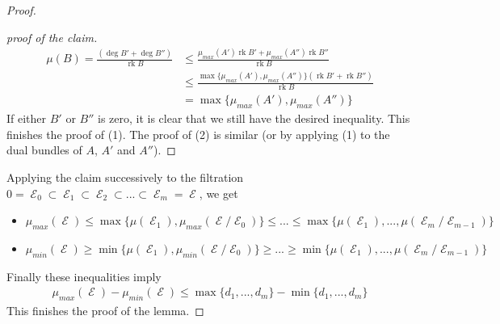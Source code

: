 \documentclass[11pt]{amsart}
\theoremstyle{definition}
\theoremstyle{remark}
\DeclareMathOperator{\E}{\mathcal{E}}
\DeclareMathOperator{\rk}{rk}
\numberwithin{equation}{section}
\begin{document}
\begin{proof}
\begin{proof}[proof of the claim]
        \begin{align*}
            \mu(B) = \frac{(\deg B' + \deg B'')}{ \rk B} 
        &\leq \frac{\mu_{max}(A') \rk B' + \mu_{max}(A'')\rk B'' }{ \rk B}
        \\& \leq  \frac{\max \lbrace\mu_{max}(A'),\mu_{max}(A'')\rbrace (\rk B' + \rk B'') }{\rk B}
        \\& = \max \lbrace\mu_{max}(A'),\mu_{max}(A'')\rbrace 
        \end{align*}
        If either $B'$ or $B''$ is zero, it is clear that we still have the desired inequality. This finishes the proof of (1). The proof of (2) is similar (or by applying (1) to the dual bundles of $A$, $A'$ and $A''$).
    \end{proof}
    Applying the claim successively to the filtration $0=\E_0 \subset \E_1 \subset \E_2 \subset ... \subset \E_m=\E$, we get 
    \begin{itemize}
        \item $\mu_{max}(\E) \leq \max \lbrace \mu (\E_1) , \mu_{max}(\E/\E_0)    \rbrace \leq ... \leq  \max \lbrace \mu (\E_1) ,..., \mu (\E_m/\E_{m-1})   \rbrace$
        \item $\mu_{min}(\E) \geq \min \lbrace \mu (\E_1) , \mu_{min}(\E/\E_0)    \rbrace \geq ... \geq  \min \lbrace \mu (\E_1) ,..., \mu(\E_m/\E_{m-1})   \rbrace$
    \end{itemize}
    Finally these inequalities imply
    \begin{align*}
     \mu_{max}(\E)-\mu_{min}(\E)   \leq  \max \lbrace d_1 ,..., d_m   \rbrace-  \min \lbrace d_1 ,..., d_m   \rbrace        
    \end{align*}
        This finishes the proof of the lemma.
   
    
\end{proof}
\end{document}
